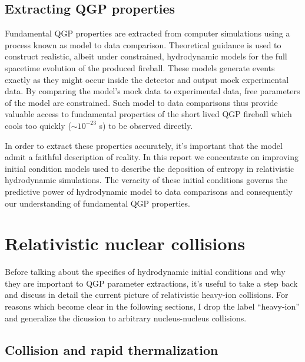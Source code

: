 \documentclass[aps,prc,reprint,amsmath,nofootinbib]{revtex4-1}
\begin{document}
\subsection{Extracting QGP properties}

Fundamental QGP properties are extracted from computer simulations using a process known as model to data comparison. Theoretical guidance is used to construct
realistic, albeit under constrained, hydrodynamic models for the full spacetime evolution of the produced fireball. These models generate events exactly as they might
occur inside the detector and output mock experimental data. By comparing the model's mock data to experimental data, free parameters of the model are constrained. Such 
model to data comparisons thus provide valuable access to fundamental properties of the short lived QGP fireball which cools too quickly (${\sim}10^{-23}$ s) to be 
observed directly.

In order to extract these properties accurately, it's important that the model admit a faithful description of reality. In this report we concentrate on improving 
initial condition models used to describe the deposition of entropy in relativistic hydrodynamic simulations. The veracity of these initial conditions governs the 
predictive power of hydrodynamic model to data comparisons and consequently our understanding of fundamental QGP properties.
  
\section{Relativistic nuclear collisions}

Before talking about the specifics of hydrodynamic initial conditions and why they are important to QGP parameter extractions, it's useful to take a step back 
and discuss in detail the current picture of relativistic heavy-ion collisions. For reasons which become clear in the following sections, I drop the 
label ``heavy-ion'' and generalize the dicussion to arbitrary nucleus-nucleus collisions.

\subsection{Collision and rapid thermalization}
\end{document}
